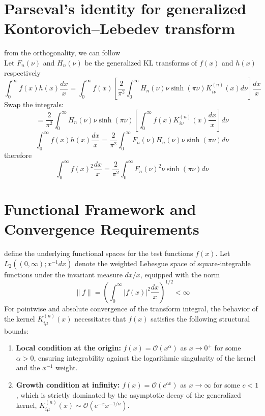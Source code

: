 \documentclass{article}
\begin{document}
\section{Parseval's identity for generalized Kontorovich–Lebedev transform}
from the orthogonality, we can follow\\
Let $F_n(\nu)$ and $H_n(\nu)$ be the generalized KL transforms of $f(x)$ and $h(x)$ respectively
\[\int_0^\infty f(x)h(x)\frac{dx}{x} = \int_0^\infty f(x) \left[ \frac{2}{\pi^2}\int_0^\infty H_n(\nu)\nu\sinh(\pi\nu)K_{i\nu}^{(n)}(x)d\nu \right] \frac{dx}{x}\]
Swap the integrals:
\[= \frac{2}{\pi^2}\int_0^\infty H_n(\nu)\nu\sinh(\pi\nu) \left[ \int_0^\infty f(x)K_{i\nu}^{(n)}(x)\frac{dx}{x} \right] d\nu\]
\[\int_0^\infty f(x)h(x)\frac{dx}{x} = \frac{2}{\pi^2}\int_0^\infty F_n(\nu)H_n(\nu)\nu\sinh(\pi\nu)d\nu\]
therefore
\[\int_0^\infty f(x)^2\frac{dx}{x} = \frac{2}{\pi^2}\int_0^\infty F_n(\nu)^2 \nu\sinh(\pi\nu)d\nu\]
\section{Functional Framework and Convergence Requirements}
define the underlying functional spaces for the test functions $f(x)$. Let $L_2((0, \infty); x^{-1}dx)$ denote the weighted Lebesgue space of square-integrable functions under the invariant measure $dx/x$, equipped with the norm
\begin{equation}
\|f\| = \left( \int_0^\infty |f(x)|^2 \frac{dx}{x} \right)^{1/2} < \infty
\end{equation}
For pointwise and absolute convergence of the transform integral, the behavior of the kernel $K_{i\mu}^{(n)}(x)$ necessitates that $f(x)$ satisfies the following structural bounds:
\begin{enumerate}
    \item \textbf{Local condition at the origin:} $f(x) = \mathcal{O}(x^\alpha)$ as $x \to 0^+$ for some $\alpha > 0$, ensuring integrability against the logarithmic singularity of the kernel and the $x^{-1}$ weight.
    \item \textbf{Growth condition at infinity:} $f(x) = \mathcal{O}(e^{cx})$ as $x \to \infty$ for some $c < 1$, which is strictly dominated by the asymptotic decay of the generalized kernel, $K_{i\mu}^{(n)}(x) \sim \mathcal{O}(e^{-x} x^{-1/n})$.
\end{enumerate}
\end{document}
